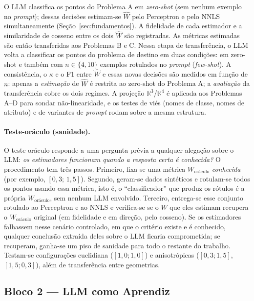 \documentclass[12pt,a4paper]{article}
\newcommand{\West}{\ensuremath{\hat{W}}}   %
\begin{document}
O LLM classifica os pontos do Problema A em \emph{zero-shot} (sem nenhum exemplo no
\emph{prompt}); dessas decisões estimam-se
\West{} pelo Perceptron e pelo NNLS simultaneamente (Seção~\ref{sec:fundamentos}). A
fidelidade de cada estimador e a similaridade de cosseno entre os dois \West{} são
registradas. As métricas estimadas são então transferidas aos Problemas B e C. Nessa etapa
de transferência, o LLM volta a classificar os pontos do problema de destino em duas
condições: em zero-shot e também com $n \in \{4, 10\}$ exemplos rotulados no \emph{prompt}
(\emph{few-shot}). A consistência, o $\kappa$ e o F1 entre \West{} e essas novas decisões
são medidos em função de $n$: apenas a \emph{estimação} de \West{} é restrita ao
zero-shot do Problema A; a \emph{avaliação} da transferência cobre os dois regimes. A
projeção $\mathbb{R}^3$/$\mathbb{R}^4$ é aplicada aos Problemas A–D
para sondar não-linearidade, e os testes de viés (nomes de classe, nomes de atributo)
e de variantes de \emph{prompt} rodam sobre a mesma estrutura.

\paragraph{Teste-oráculo (sanidade).}
O teste-oráculo responde a uma pergunta prévia a qualquer alegação sobre o LLM: \emph{os
estimadores funcionam quando a resposta certa é conhecida?} O procedimento tem três
passos. Primeiro, fixa-se uma métrica $W_{\text{oráculo}}$ \emph{conhecida} (por exemplo,
$[0{,}3;\,1{,}5]$). Segundo, geram-se dados sintéticos e rotulam-se todos os pontos usando
essa métrica, isto é, o ``classificador'' que produz os rótulos é a própria
$W_{\text{oráculo}}$, sem nenhum LLM envolvido. Terceiro, entrega-se esse conjunto
rotulado ao Perceptron e ao NNLS e verifica-se se o $W$ que eles estimam recupera o
$W_{\text{oráculo}}$ original (em fidelidade e em direção, pelo cosseno). Se os
estimadores falhassem nesse cenário controlado, em que o critério existe e é conhecido,
qualquer conclusão extraída deles sobre o LLM ficaria comprometida; se recuperam, ganha-se
um piso de sanidade para todo o restante do trabalho.
Testam-se configurações euclidiana ($[1{,}0;1{,}0]$) e anisotrópicas ($[0{,}3;1{,}5]$,
$[1{,}5;0{,}3]$), além de transferência entre geometrias.

\subsection{Bloco 2 — LLM como Aprendiz}
\end{document}
